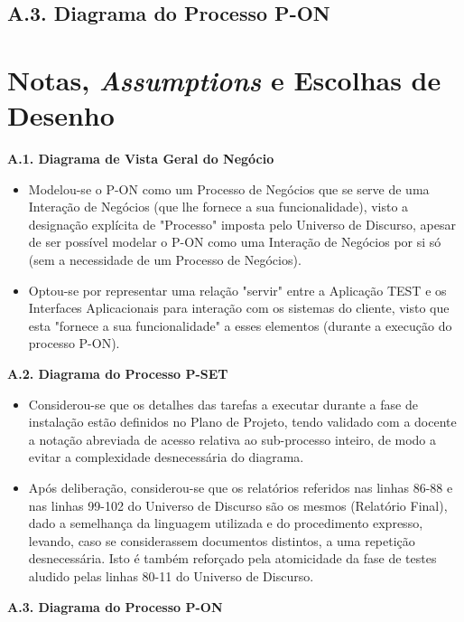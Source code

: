 \documentclass[12pt,a4paper]{article}
\begin{document}
\begin{landscape}
	\section*{A.3. Diagrama do Processo P-ON}
	
\end{landscape}

\section*{Notas, \emph{Assumptions} e Escolhas de Desenho} \label{notes}
\normalsize
\textbf{A.1. Diagrama de Vista Geral do Negócio}
\begin{itemize}
	\item Modelou-se o P-ON como um Processo de Negócios que se serve de uma Interação de Negócios (que lhe fornece a sua funcionalidade), visto a designação explícita de "Processo" imposta pelo Universo de Discurso, apesar de ser possível modelar o P-ON como uma Interação de Negócios por si só (sem a necessidade de um Processo de Negócios).
	\item Optou-se por representar uma relação "servir" entre a Aplicação TEST e os Interfaces Aplicacionais para interação com os sistemas do cliente, visto que esta "fornece a sua funcionalidade" a esses elementos (durante a execução do processo P-ON).
\end{itemize}
\textbf{A.2. Diagrama do Processo P-SET}
\begin{itemize}
	\item Considerou-se que os detalhes das tarefas a executar durante a fase de instalação estão definidos no Plano de Projeto, tendo validado com a docente a notação abreviada de acesso relativa ao sub-processo inteiro, de modo a evitar a complexidade desnecessária do diagrama.
	\item Após deliberação, considerou-se que os relatórios referidos nas linhas 86-88 e nas linhas 99-102 do Universo de Discurso são os mesmos (Relatório Final), dado a semelhança da linguagem utilizada e do procedimento expresso, levando, caso se considerassem documentos distintos, a uma repetição desnecessária. Isto é também reforçado pela atomicidade da fase de testes aludido pelas linhas 80-11 do Universo de Discurso.
\end{itemize}
\textbf{A.3. Diagrama do Processo P-ON}
\end{document}
